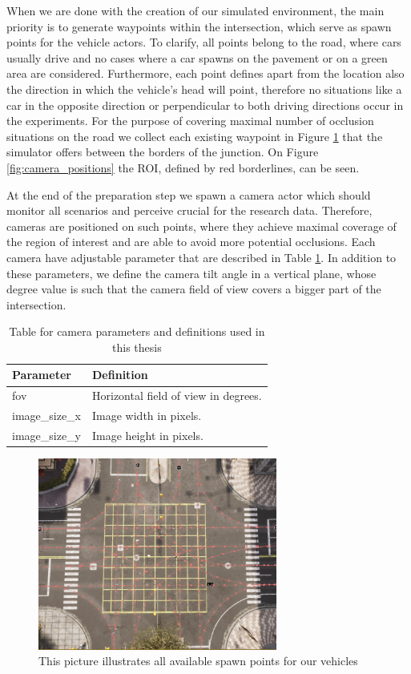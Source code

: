 When we are done with the creation of our simulated environment, the main priority is to generate waypoints within the intersection, which serve as spawn points for the vehicle actors. To clarify, all points belong to the road, where cars usually drive and no cases where a car spawns on the pavement or on a green area are considered. Furthermore, each point defines apart from the location also the direction in which the vehicle's head will point, therefore no situations like a car in the opposite direction or perpendicular to both driving directions occur in the experiments. For the purpose of covering maximal number of occlusion situations on the road we collect each existing waypoint in Figure \ref{fig:waypoints} that the simulator offers between the borders of the junction. On Figure \ref{fig:camera_positions} the ROI, defined by red borderlines, can be seen.

At the end of the preparation step we spawn a camera actor which should monitor all scenarios and perceive crucial for the research data. Therefore, cameras are positioned on such points, where they achieve maximal coverage of the region of interest and are able to avoid more potential occlusions. Each camera have adjustable parameter that are described in Table \ref{tab:camera_params}. In addition to these parameters, we define the camera tilt angle in a vertical plane, whose degree value is such that the camera field of view covers a bigger part of the intersection. 
\begin{table}[h]
\caption{Table for camera parameters and definitions used in this thesis\label{tab:camera_params}}
\centering
    \begin{tabular}{ | l | p{5cm} |}
    \hline
    Parameter & Definition  \\ \hline
    fov & Horizontal field of view in degrees. \\ \hline
    image\_size\_x & Image width in pixels. \\ \hline
    image\_size\_y & Image height in pixels. \\ \hline
    \end{tabular}
\end{table}

\begin{figure} [h!]
    \centering
    \includegraphics[width=0.7\textwidth]{images/waypoints.png}
    \caption[Intersection waypoints]{This picture illustrates all available spawn points for our vehicles}
    \label{fig:waypoints}
\end{figure}
\newpage

